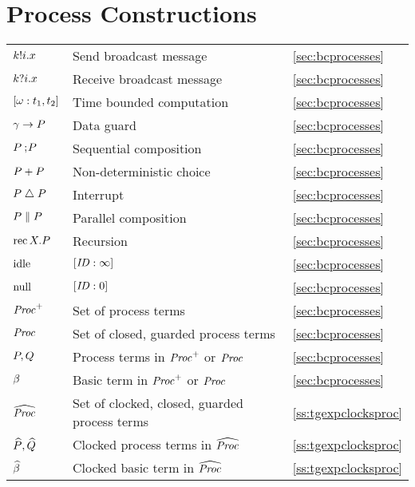 {\section*{Process Constructions}
\begin{tabular}{l>{\raggedright}p{.5\linewidth}<{}l}
${k}!{i}.x$ & Send broadcast message & \ref{sec:bcprocesses} \\
${k}?{i}.x$ & Receive broadcast message & \ref{sec:bcprocesses} \\  
$[\omega : t_1, t_2]$ & Time bounded computation & \ref{sec:bcprocesses} \\ 
$\gamma \rightarrow P$ & Data guard & \ref{sec:bcprocesses} \\ 
${P} \mathbin{\mathrm{;}\!} {P}$ & Sequential composition & \ref{sec:bcprocesses} \\ 
${P} \mathbin{\mathrm{+}} {P}$ & Non-deterministic choice & \ref{sec:bcprocesses} \\ 
${P} \mathrel{\mathord{\triangle}} {P}$ & Interrupt & \ref{sec:bcprocesses} \\ 
$\P \parallel \P$ & Parallel composition & \ref{sec:bcprocesses} \\ 
$\mathrm{rec\,} X.{P}$ & Recursion & \ref{sec:bcprocesses} \\ 
$\mathrm{idle}$ & $[{\text{\it ID\/}} : \infty]$ & \ref{sec:bcprocesses} \\ 
$\mathrm{null}$ & $[{\text{\it ID\/}} : 0]$ & \ref{sec:bcprocesses} \\ 
$\text{\it Proc\/}^{+}_{}$ & Set of process terms & \ref{sec:bcprocesses} \\ 
$\text{\it Proc\/}_{}$ & Set of closed, guarded process terms & \ref{sec:bcprocesses} \\ 
${P},{Q}$ & Process terms in $\text{\it Proc\/}^{+}_{}$ or $\text{\it Proc\/}_{}$ & \ref{sec:bcprocesses} \\
$\beta$ & Basic term in $\text{\it Proc\/}^{+}_{}$ or $\text{\it Proc\/}_{}$ & \ref{sec:bcprocesses} \\ 
$\widehat{\text{\it Proc\/}_{}}$ & Set of clocked, closed, guarded process terms & \ref{ss:tgexpclocksproc} \\ 
${\widehat{P}},{\widehat{Q}}$ & Clocked process terms in $\widehat{\text{\it Proc\/}_{}}$ & \ref{ss:tgexpclocksproc} \\
${\widehat{\beta}}$ & Clocked basic term in $\widehat{\text{\it Proc\/}_{}}$ & \ref{ss:tgexpclocksproc} \\ 
\end{tabular}
\vfil

}
